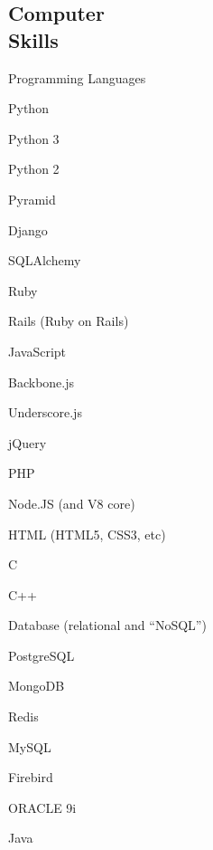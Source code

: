 \documentclass[margin,line]{resume}
\begin{document}
\begin{resume}
	\section{\mysidestyle Computer\\Skills}
	Programming Languages
	\begin{list2}
		\vspace*{1mm}
		\item Python
		\begin{list2}
			\item Python 3
			\item Python 2
			\item Pyramid
			\item Django
			\item SQLAlchemy
		\end{list2}
		\item Ruby
		\begin{list2}
			\item Rails (Ruby on Rails)
		\end{list2}
		\item JavaScript
		\begin{list2}
			\vspace*{1mm}
			\item Backbone.js
			\item Underscore.js
			\item jQuery
		\end{list2}
		\item PHP
		\item Node.JS (and V8 core)
		\item HTML (HTML5, CSS3, etc)
		\item C
		\item C++

		\item Database (relational and ``NoSQL'')
		\begin{list2}
			\item PostgreSQL
			\item MongoDB
			\item Redis
			\item MySQL
			\item Firebird
			\item ORACLE 9i
		\end{list2}
		\item Java
	\end{list2}


\end{resume}
\end{document}
